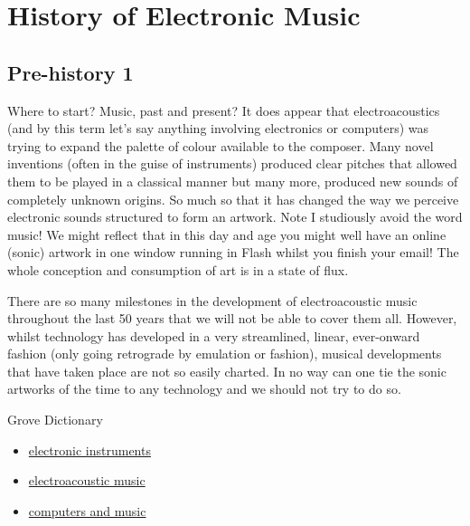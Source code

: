 
\chapter{History of Electronic Music}
\label{history}

\section{Pre-history 1}
Where to start? Music, past and present? It does appear that electroacoustics (and by this term let's say anything involving electronics or computers) was trying to expand the palette of colour available to the composer. Many novel inventions (often in the guise of instruments) produced clear pitches that allowed them to be played in a classical manner but many more, produced new sounds of completely unknown origins. So much so that it has changed the way we perceive electronic sounds structured to form an artwork. Note I studiously avoid the word music! We might reflect that in this day and age you might well have an online (sonic) artwork in one window running in Flash whilst you finish your email! The whole conception and consumption of art is in a state of flux.

There are so many milestones in the development of electroacoustic music throughout the last 50 years that we will not be able to cover them all. However, whilst technology has developed in a very streamlined, linear, ever-onward fashion (only going retrograde by emulation or fashion), musical developments that have taken place are not so easily charted. In no way can one tie the sonic artworks of the time to any technology and we should not try to do so.

Grove Dictionary
\begin{itemize}
\item \href{http://www.grovemusic.com/shared/views/article.html?from=search&session_search_id=1011869954&session_name=e09647b5a66fbfeb&hitnum=1&section=music.08694&start=1&query=electronic%20instruments&search_subview=search_subject}{electronic instruments}
\item \href{http://www.grovemusic.com/shared/views/article.html?section=music.08695}{electroacoustic music}
\item \href{http://www.grovemusic.com/shared/views/article.html?section=music.40583}{computers and music}
\end{itemize}


